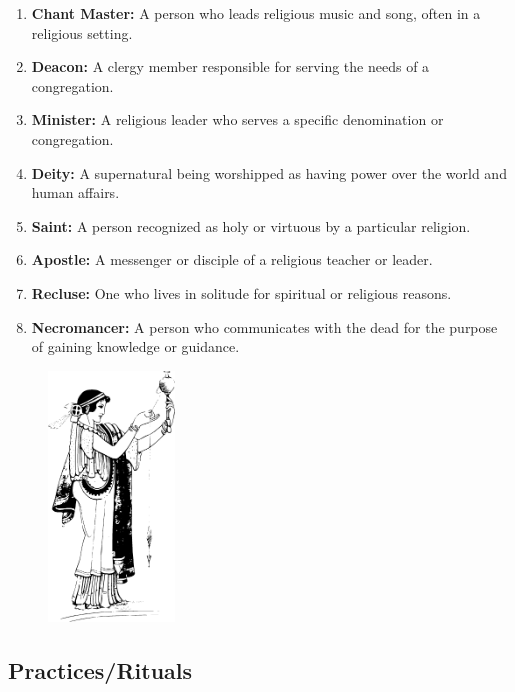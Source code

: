 \documentclass[12pt]{book}
\begin{document}
\begin{enumerate}
    \item \textbf{Chant Master:} A person who leads religious music and song, often in a religious setting.
    \item \textbf{Deacon:} A clergy member responsible for serving the needs of a congregation.
    \item \textbf{Minister:} A religious leader who serves a specific denomination or congregation.
    \item \textbf{Deity:} A supernatural being worshipped as having power over the world and human affairs.
    \item \textbf{Saint:} A person recognized as holy or virtuous by a particular religion.
    \item \textbf{Apostle:} A messenger or disciple of a religious teacher or leader.
    \item \textbf{Recluse:} One who lives in solitude for spiritual or religious reasons.
    \item \textbf{Necromancer:} A person who communicates with the dead for the purpose of gaining knowledge or guidance.
\end{enumerate}

\begin{figure}[h]
    \centering
    \includegraphics[width=0.3\textwidth]{./images/religion02.pdf}
\end{figure}


\subsection{\textbf{Practices/Rituals}}
\end{document}
